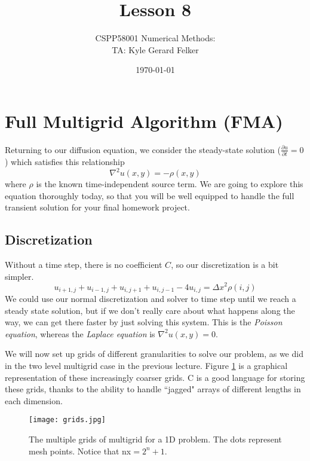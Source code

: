 \documentclass[11pt]{article}
\begin{document}
\title{Lesson 8} 
\author{CSPP58001 Numerical Methods: \\ TA: Kyle Gerard Felker}
\date{\today}
\maketitle

\section{Full Multigrid Algorithm (FMA)}
Returning to our diffusion equation, we consider the steady-state solution ($\frac{\partial u}{\partial t} = 0$) which satisfies this relationship
\begin{equation}
\nabla^2 u(x,y) = - \rho(x,y)
\end{equation}
where $\rho$ is the known time-independent source term. We are going to explore this equation thoroughly today, so that you will be well equipped to handle the full transient solution for your final homework project.

\subsection{Discretization}
Without a time step, there is no coefficient $C$, so our discretization is a bit simpler.
\begin{equation}
u_{i+1,j} + u_{i-1,j} + u_{i,j+1} + u_{i,j-1} - 4u_{i,j} = \Delta x^2 \rho (i,j)
\end{equation}
We could use our normal discretization and solver to time step until we reach a steady state solution, but if we don't really care about what happens along the way, we can get there faster by just solving this system. This is the \emph{Poisson equation}, whereas the \emph{Laplace equation} is $\nabla^2 u(x,y) = 0$. 

We will now set up grids of different granularities to solve our problem, as we did in the two level multigrid case in the previous lecture. Figure \ref{fig:grids} is a graphical representation of these increasingly coarser grids. C is a good language for storing these grids, thanks to the ability to handle ``jagged" arrays of different lengths in each dimension.  

\begin{figure}
\texttt{[image: grids.jpg]}
\caption{The multiple grids of multigrid for a 1D problem. The dots represent mesh points. Notice that nx$=2^n +1$. }
\label{fig:grids}
\end{figure}
\end{document}

